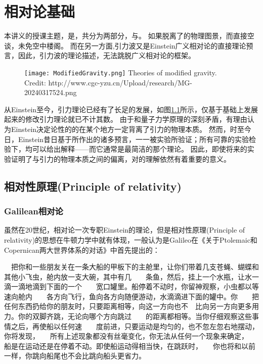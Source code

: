 \chapter{相对论基础}

本讲义的授课主题，是\gw\DA，共分为两部分，\emph{\gw}与\emph{\DA}。
如果脱离了\gw 的物理图景，而直接空谈\DA，未免空中楼阁。
而在另一方面,引力波又是Einstein广义相对论的直接理论预言，因此，引力波的理论描述，无法跳脱广义相对论的框架。

\begin{figure}[htp]
\centering
\texttt{[image: ModifiedGravity.png]}
  {Theories of modified gravity. Credit: http://www.cgc-yzu.cn/Upload/research/MG-20240317524.png}
\label{fig:ModGrav}
\end{figure}

从Einstein至今，引力理论已经有了长足的发展，如图\ref{fig:ModGrav}所示，仅基于\GR 基础上发展起来的修改引力理论就已不计其数。
由于和量子力学原理的深刻矛盾，有理由认为Einstein决定论性的的\GR 在某个地方一定背离了引力的物理本质。
然而，时至今日，Einstein昔日基于\GR 所作出的诸多预言，一一被实验所验证；所有可靠的实验检验下，\GR 均可以给出解释——而它通常是最简洁的那个理论。
因此，即使将来的实验证明了\GR 与引力的物理本质之间的偏离，对\GR 的理解依然有着重要的意义。

\section{相对性原理(Principle of relativity)}

\subsection{Galilean相对论}
虽然在20世纪，相对论一次专职Einstein的理论，但是相对性原理(Principle of relativity)的思想在牛顿力学中就有体现，一般认为是Galileo在《关于Ptolemaic和 Copernican两大世界体系的对话》中首先提出的：
\begin{myprop}{}{}
　把你和一些朋友关在一条大船的甲板下的主舱里，让你们带着几支苍蝇、蝴蝶和其他小飞虫，舱内放一支大碗，其中有几　　条鱼，然后，挂上一个水瓶，让水一滴一滴地滴到下面的一个　　宽口罐里。船停着不动时，你留神观察，小虫都以等速向舱内　　各方向飞行，鱼向各方向随便游动，水滴滴进下面的罐中。你　　把任何东西扔给你的朋友时，只要距离相等，向这一方向也不　比向另一方向更多用力。你的双脚齐跳，无论向哪个方向跳过　　的距离都相等。当你仔细观察这些事情之后，再使船以任何速　　度前进，只要运动是均匀的，也不忽左忽右地摆动，你将发现，　　所有上述现象都没有丝毫变化，你无法从任何一个现象来确定，　　船是在运动还是在停着不动。即使船运动得相当快，在跳跃时，　　你也将和以前一样，你跳向船尾也不会比跳向船头更省力。
\end{myprop}

